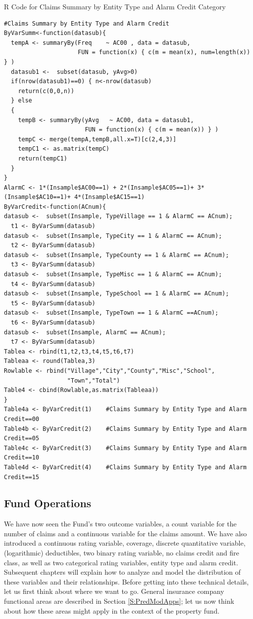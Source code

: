 \documentclass[]{book}
\begin{document}
R Code for Claims Summary by Entity Type and Alarm Credit Category

\hypertarget{display.RateAlarmCredit.2}{}
\begin{verbatim}
#Claims Summary by Entity Type and Alarm Credit
ByVarSumm<-function(datasub){
  tempA <- summaryBy(Freq    ~ AC00 , data = datasub,   
                     FUN = function(x) { c(m = mean(x), num=length(x)) } )
  datasub1 <-  subset(datasub, yAvg>0)
  if(nrow(datasub1)==0) { n<-nrow(datasub)
    return(c(0,0,n))
  } else 
  {
    tempB <- summaryBy(yAvg   ~ AC00, data = datasub1,
                       FUN = function(x) { c(m = mean(x)) } )
    tempC <- merge(tempA,tempB,all.x=T)[c(2,4,3)]
    tempC1 <- as.matrix(tempC)
    return(tempC1)
  }
}
AlarmC <- 1*(Insample$AC00==1) + 2*(Insample$AC05==1)+ 3*(Insample$AC10==1)+ 4*(Insample$AC15==1)
ByVarCredit<-function(ACnum){
datasub <-  subset(Insample, TypeVillage == 1 & AlarmC == ACnum); 
  t1 <- ByVarSumm(datasub)
datasub <-  subset(Insample, TypeCity == 1 & AlarmC == ACnum);      
  t2 <- ByVarSumm(datasub)
datasub <-  subset(Insample, TypeCounty == 1 & AlarmC == ACnum);   
  t3 <- ByVarSumm(datasub)
datasub <-  subset(Insample, TypeMisc == 1 & AlarmC == ACnum);
  t4 <- ByVarSumm(datasub)
datasub <-  subset(Insample, TypeSchool == 1 & AlarmC == ACnum);    
  t5 <- ByVarSumm(datasub)
datasub <-  subset(Insample, TypeTown == 1 & AlarmC ==ACnum);      
  t6 <- ByVarSumm(datasub)
datasub <-  subset(Insample, AlarmC == ACnum);  
  t7 <- ByVarSumm(datasub)
Tablea <- rbind(t1,t2,t3,t4,t5,t6,t7)
Tableaa <- round(Tablea,3)
Rowlable <- rbind("Village","City","County","Misc","School",
                  "Town","Total")
Table4 <- cbind(Rowlable,as.matrix(Tableaa))
}
Table4a <- ByVarCredit(1)    #Claims Summary by Entity Type and Alarm Credit==00
Table4b <- ByVarCredit(2)    #Claims Summary by Entity Type and Alarm Credit==05 
Table4c <- ByVarCredit(3)    #Claims Summary by Entity Type and Alarm Credit==10
Table4d <- ByVarCredit(4)    #Claims Summary by Entity Type and Alarm Credit==15
\end{verbatim}

\subsection{Fund Operations}\label{fund-operations}

We have now seen the Fund's two outcome variables, a count variable for
the number of claims and a continuous variable for the claims amount. We
have also introduced a continuous rating variable, coverage, discrete
quantitative variable, (logarithmic) deductibles, two binary rating
variable, no claims credit and fire class, as well as two categorical
rating variables, entity type and alarm credit. Subsequent chapters will
explain how to analyze and model the distribution of these variables and
their relationships. Before getting into these technical details, let us
first think about where we want to go. General insurance company
functional areas are described in Section \ref{S:PredModApps}; let us
now think about how these areas might apply in the context of the
property fund.
\end{document}
